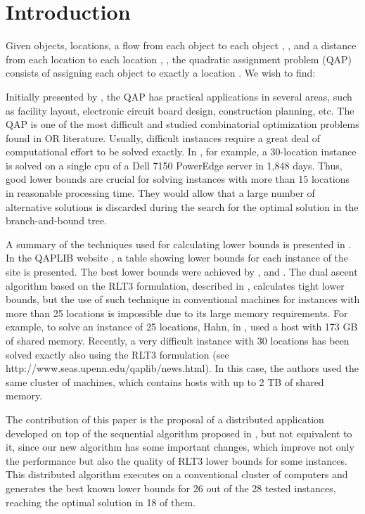 \documentclass[authoryear,12pt,a4paper,times]{elsarticle}
\begin{document}
\onehalfspacing 

\section{Introduction} \label{sec:introducao}

Given  objects,  locations, a flow  from each object  to each object , , and a distance  from each location  to each location
, , the quadratic assignment problem (QAP) consists of assigning  each object  to exactly  a location . We wish to find:




Initially presented by \citet{koopman1957}, 
the QAP has practical applications in  several areas, such as facility layout, electronic circuit board design, construction planning, etc.  
The QAP is one of the most difficult and studied combinatorial optimization problems found in OR literature. Usually, difficult instances require 
a great deal of computational effort to be solved exactly. In \citet{adams2007},  for example, a 30-location instance is solved on a single 
cpu of a Dell 7150 PowerEdge server in 1,848 days. 
Thus, good lower bounds are crucial for solving  instances with more than 15 
locations in reasonable processing time.  They would allow that  a large number of  alternative solutions  is discarded  during  the search for the  optimal solution in the branch-and-bound tree. 

A summary of the techniques used for calculating lower bounds  is presented in \citet{loiola2007}. 
In the QAPLIB website \citet{qaplib}, a table showing lower bounds for each instance of the site is presented.
The best lower bounds were achieved by \citet{burer2006}, \citet{adams2007} and  \citet{hahn2012}.
The dual ascent algorithm based on the RLT3 formulation, described in \citet{hahn2012}, 
calculates tight lower bounds, but the use of such technique in conventional machines for instances with more than 25 locations is impossible due to 
its large memory requirements. For example, to solve an instance of 25 locations, Hahn, in \citet{hahn2012}, used a host with 173 GB of shared memory.
Recently, a very difficult instance with 30 locations has been solved exactly also using the RLT3 formulation (see
http://www.seas.upenn.edu/qaplib/news.html). In this case, the authors used the same cluster of machines, which contains hosts with up to 2 TB
of shared memory. 

The contribution of this paper is the proposal of a distributed  application developed
on top of  the   sequential  algorithm proposed in \citet{hahn2012},  but not equivalent to it, since our new algorithm has some important changes, which improve not only the performance
but  also the quality of RLT3 lower bounds for some instances.   This distributed algorithm  executes  on  a conventional  cluster of computers  and generates the best known lower bounds for 26 out of the
28 tested instances, reaching the optimal solution in 18 of them.
\end{document}
